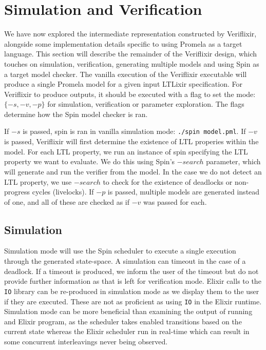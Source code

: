 \section{Simulation and Verification} \label{sec:simulation_verification}
We have now explored the intermediate representation constructed by Veriflixir, alongside some implementation details specific to using Promela as a target language. This section will describe the remainder of the Veriflixir design, which touches on simulation, verification, generating multiple models and using Spin as a target model checker. The vanilla execution of the Veriflixir executable will produce a single Promela model for a given input LTLixir specification. For Veriflixir to produce outputs, it should be executed with a flag to set the mode: $\{-s, -v, -p\}$ for simulation, verification or parameter exploration. The flags determine how the Spin model checker is ran.
\par
If $-s$ is passed, spin is ran in vanilla simulation mode: \texttt{./spin model.pml}. If $-v$ is passed, Veriflixir will first determine the existence of LTL properies within the model. For each LTL property, we run an instance of spin specifying the LTL property we want to evaluate. We do this using Spin's $-search$ parameter, which will generate and run the verifier from the model. In the case we do not detect an LTL property, we use $-search$ to check for the existence of deadlocks or non-progress cycles (livelocks). If $-p$ is passed, multiple models are generated instead of one, and all of these are checked as if $-v$ was passed for each.
\subsection{Simulation}
Simulation mode will use the Spin scheduler to execute a single execution through the generated state-space. A simulation can timeout in the case of a deadlock. If a timeout is produced, we inform the user of the timeout but do not provide further information as that is left for verification mode. Elixir calls to the \texttt{IO} library can be re-produced in simulation mode as we display them to the user if they are executed. These are not as proficient as using \texttt{IO} in the Elixir runtime. Simulation mode can be more beneficial than examining the output of running and Elixir program, as the scheduler takes enabled transitions based on the current state whereas the Elixir scheduler run in real-time which can result in some concurrent interleavings never being observed.

